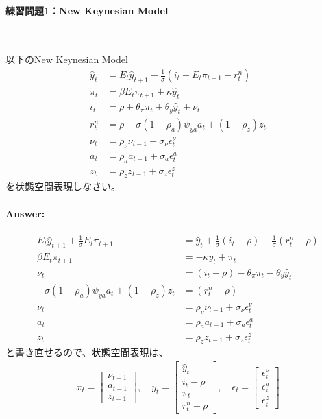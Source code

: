 \documentclass[a4j, dvipdfmx]{jarticle}
\begin{document}
\paragraph{練習問題1：New Keynesian Model}~

以下のNew Keynesian Model
\begin{align}
\hat{y}_t &= E_t \hat{y}_{t+1} -\frac{1}{\sigma} (i_t - E_t\pi_{t+1} - r^n_t) \\
\pi_t &= \beta E_t\pi_{t+1} + \kappa \hat{y}_t\\
i_t &= \rho + \theta_\pi \pi_t + \theta_y \hat{y}_t + \nu_t \\
r^n_t &= \rho - \sigma (1-\rho_a) \psi_{ya} a_t +(1-\rho_z)z_t\\
\nu_t &= \rho_\nu \nu_{t-1} + \sigma_\nu \epsilon^\nu_t\\
a_t &= \rho_a a_{t-1} + \sigma_a \epsilon^a_t\\
z_t &= \rho_z z_{t-1} + \sigma_z \epsilon^z_t
\end{align}
を状態空間表現しなさい。

\paragraph{Answer:}
\begin{align}
E_t\hat{y}_{t+1} + \frac{1}{\sigma}E_t\pi_{t+1} &= \hat{y}_t + \frac{1}{\sigma}(i_t - \rho) - \frac{1}{\sigma} (r^n_t - \rho) \\
\beta E_t\pi_{t+1} &= -\kappa y_t + \pi_t\\
\nu_t &= (i_t - \rho) - \theta_\pi \pi_t - \theta_y \hat{y}_t\\
-\sigma(1-\rho_a)\psi_{ya} a_t + (1-\rho_z)z_t &= (r^n_t - \rho)\\
\nu_t &= \rho_\nu \nu_{t-1} + \sigma_\nu \epsilon^\nu_t\\
a_t &= \rho_a a_{t-1} + \sigma_a \epsilon^a_t\\
z_t &= \rho_z z_{t-1} + \sigma_z \epsilon^z_t
\end{align}
と書き直せるので、状態空間表現は、
\begin{align}
x_t = \begin{bmatrix} \nu_{t-1} \\ a_{t-1} \\ z_{t-1} \end{bmatrix}, \quad y_t = \begin{bmatrix}\hat{y}_t \\ i_t - \rho \\ \pi_t \\ r^n_t - \rho\end{bmatrix}, \quad \epsilon_t = \begin{bmatrix}\epsilon^\nu_t \\ \epsilon^a_t \\ \epsilon^z_t\end{bmatrix}
\end{align}
\end{document}
